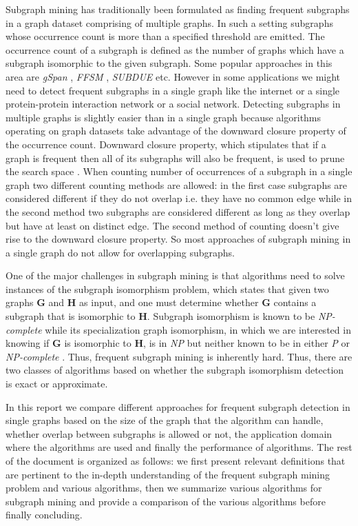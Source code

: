 \documentclass{article}      %
\begin{document}
Subgraph mining has traditionally been formulated as finding frequent subgraphs in a graph dataset comprising of multiple graphs.
In such a setting subgraphs whose occurrence count is more than a specified threshold are emitted. The occurrence count of a subgraph is defined
as the number of graphs which have a subgraph isomorphic to the given subgraph. Some popular approaches in this area are \emph{gSpan} \cite{Yan2002},
\emph{FFSM} \cite{Cong2002}, \emph{SUBDUE} \cite{Holder1994} etc. However in some applications we might need to detect frequent subgraphs in
a single graph like the internet or a single protein-protein interaction network or a social network. Detecting subgraphs in multiple graphs is
slightly easier than in a single graph because algorithms operating on graph datasets take advantage of the downward closure property of the 
occurrence count. Downward closure property, which stipulates that if a graph is frequent then all of its subgraphs will also be frequent,
is used to prune the search space \cite{Zou2010}. When counting number of occurrences of a subgraph in
a single graph two different counting methods are allowed: in the first case subgraphs are considered different if they do not overlap 
i.e. they have no common edge while in the 
second method two subgraphs are considered different as long as they overlap but have at least on distinct edge. The second method of counting
doesn't give rise to the downward closure property. So most approaches of subgraph mining in a single graph do not allow for overlapping subgraphs.

One of the major challenges in subgraph mining is that algorithms need to solve instances of the subgraph isomorphism problem, 
which states that given two graphs {\bf G} and {\bf H} as input, and one must determine whether {\bf G} contains a subgraph that is isomorphic to {\bf H}.
Subgraph isomorphism is known to be \emph{NP-complete} while its specialization graph isomorphism, in which we are interested in knowing if {\bf G} 
is isomorphic to {\bf H}, is in \emph{NP} but neither known to be in either \emph{P} or \emph{NP-complete} \cite{Gary1979}. Thus, frequent subgraph mining
is inherently hard. Thus, there are two classes of algorithms based on whether the subgraph isomorphism detection is exact or approximate. 

In this report we compare different approaches for frequent subgraph detection in single graphs based on the size of the graph that the algorithm
can handle, whether overlap between subgraphs is allowed or not, the application domain where the algorithms are used and finally the performance of
algorithms. The rest of the document is organized as follows: we first present relevant definitions that are pertinent to the in-depth understanding 
of the frequent subgraph mining problem and various algorithms, then we summarize various algorithms for subgraph mining and provide
a comparison of the various algorithms before finally concluding.
\end{document}
